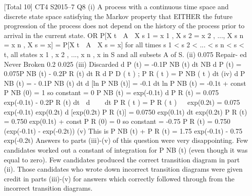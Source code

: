 [Total 10]
CT4 S2015–7
\newpage
Q8
(i)
A process with a continuous time space and discrete state space
satisfying the Markov property that
EITHER
the future progression of the process does not depend on the history of the
process prior to arrival in the current state.
OR
P[X t  A  X s 1 = x 1 , X s 2 = x 2 , ..., X s n = x n , X s = x] = P[X t  A  X s = x]
for all times s 1 < s 2 < ... < s n < s < t, all states x 1 , x 2 , ..., x n , x in S and all
subsets A of S.
(ii)
0.075
Repair-
ed
Never
Broken
0.2
0.025
(iii)
Discarded
d
P (t) = -0.1P NB (t)
dt NB
d
P (t) = 0.075P NB (t) - 0.2P R (t)
dt R
d
P D ( t ) ;\+ P R ( t ) \;= P NB ( t )
dt
(iv)
d
P NB (t) = - 0.1P NB (t)
dt
d
[ln P NB (t)] = -0.1
dt
ln P NB (t) = -0.1t + const
P NB (0) = 1 so constant = 0
P NB (t) = exp(-0.1t)
d
P R (t) = 0.075 exp(-0.1t) - 0.2P R (t)
dt
 d

  dt P R ( t ) \;= P R ( t )   exp(0.2t) = 0.075 exp(-0.1t) exp(0.2t)
d
[exp(0.2t) P R (t)] = 0.0750 exp(0.1t)
dt
exp(0.2t) P R (t) = 0.750 exp(0.1t) + const
P R (0) = 0 so constant = -0.75
P R (t) = 0.750 (exp(-0.1t) - exp(-0.2t))
(v)
This is P NB (t) + P R (t)
= 1.75 exp(-0.1t) - 0.75 exp(-0.2t)
Answers to parts (iii)-(v) of this question were very disappointing. Few
candidates worked out a constant of integration for P NB (t) (even though it was
equal to zero). Few candidates produced the correct transition diagram in
part (ii). Those candidates who wrote down incorrect transition diagrams
were given credit in parts (iii)-(v) for answers which correctly followed through
from the incorrect transition diagrams.
